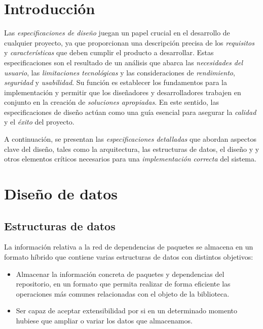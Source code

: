 
\section{Introducción}

Las \textit{especificaciones de diseño} juegan un papel crucial en el desarrollo de cualquier proyecto, 
ya que proporcionan una descripción precisa de los \textit{requisitos} y \textit{características} que 
deben cumplir el producto a desarrollar. Estas 
especificaciones son el resultado de un análisis que abarca 
las \textit{necesidades del usuario}, las \textit{limitaciones tecnológicas} y las consideraciones 
de \textit{rendimiento}, \textit{seguridad} y \textit{usabilidad}. Su función es establecer 
los fundamentos para la implementación y permitir que los diseñadores
y desarrolladores trabajen en conjunto en la creación de \textit{soluciones apropiadas}. 
En este sentido, las especificaciones de diseño actúan como una guía esencial para asegurar 
la \textit{calidad} y el \textit{éxito} del proyecto. 

A continuación, se presentan 
las \textit{especificaciones detalladas} que abordan aspectos clave del diseño, tales 
como la arquitectura, las estructuras de datos, el diseño y y otros 
elementos críticos necesarios para una \textit{implementación correcta} del sistema.

\section{Diseño de datos}

\subsection{Estructuras de datos}
La información relativa a la red de dependencias de paquetes se almacena en un formato híbrido
que contiene varias estructuras de datos con distintos objetivos:

\begin{itemize}
    \item Almacenar la información concreta de paquetes y dependencias del repositorio, en un formato
          que permita realizar de forma eficiente las operaciones más comunes relacionadas con el objeto
          de la biblioteca.

    \item Ser capaz de aceptar extensibilidad por si en un determinado momento hubiese que ampliar
          o variar los datos que almacenamos.
\end{itemize}
\

